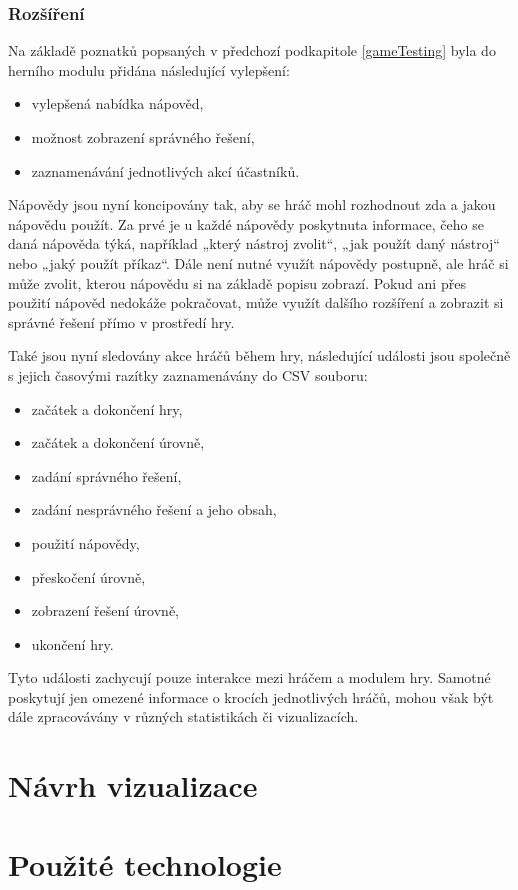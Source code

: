\documentclass[
  digital, %
  oneside, %
  table,   %
  nolof,     %
  nolot,     %
]{fithesis3}
\begin{document}
\subsection{Rozšíření}
Na základě poznatků popsaných v předchozí podkapitole \ref{gameTesting} byla do herního modulu přidána následující vylepšení:
\begin{itemize}
  \item vylepšená nabídka nápověd,
  \item možnost zobrazení správného řešení,
  \item zaznamenávání jednotlivých akcí účastníků.
\end{itemize}
Nápovědy jsou nyní koncipovány tak, aby se hráč mohl rozhodnout zda a jakou nápovědu použít. Za prvé je u každé nápovědy poskytnuta informace, čeho se daná nápověda týká, například „který nástroj zvolit“, „jak použít daný nástroj“ nebo „jaký použít příkaz“. Dále není nutné využít nápovědy postupně, ale hráč si může zvolit, kterou nápovědu si na základě popisu zobrazí. Pokud ani přes použití nápověd nedokáže pokračovat, může využít dalšího rozšíření a zobrazit si správné řešení přímo v prostředí hry. \cite{ctfDesign}\par
Také jsou nyní sledovány akce hráčů během hry, následující události jsou společně s jejich časovými razítky zaznamenávány do CSV souboru:
\begin{itemize}
  \item začátek a dokončení hry,
  \item začátek a dokončení úrovně,
  \item zadání správného řešení,
  \item zadání nesprávného řešení a jeho obsah,
  \item použití nápovědy,
  \item přeskočení úrovně,
  \item zobrazení řešení úrovně,
  \item ukončení hry.
\end{itemize}
Tyto události zachycují pouze interakce mezi hráčem a modulem hry. Samotné poskytují jen omezené informace o krocích jednotlivých hráčů, mohou však být dále zpracovávány v různých statistikách či vizualizacích.

\chapter{Návrh vizualizace}

\chapter{Použité technologie}
\end{document}
